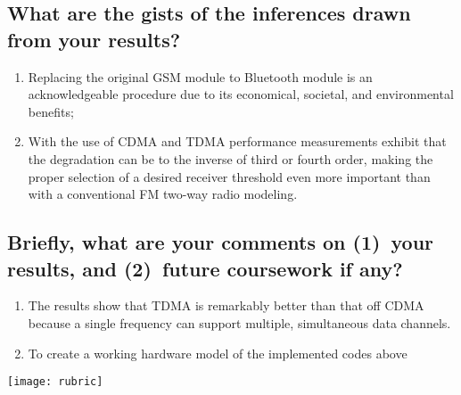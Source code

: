 \subsection{What are the gists of the inferences drawn from your results?}
\begin{enumerate}
	\item Replacing the original GSM module to Bluetooth module is an acknowledgeable procedure due to its economical, societal, and environmental benefits;
	\item With the use of CDMA and TDMA performance measurements exhibit that the degradation can be to the inverse of third or fourth order, making the proper selection of a desired receiver threshold even more important than with a conventional FM two-way radio modeling.
\end{enumerate}

\subsection{Briefly, what are your comments on (1)~your results, and  (2)~future coursework if any?}
\begin{enumerate}
	\item The results show that TDMA is remarkably better than that off CDMA because a single frequency can support multiple, simultaneous data channels.
	\item To create a working hardware model of the implemented codes above
\end{enumerate}	




\newpage
\begin{figure*}[!t]
	\texttt{[image: rubric]} 
\end{figure*}
\cleardoublepage

